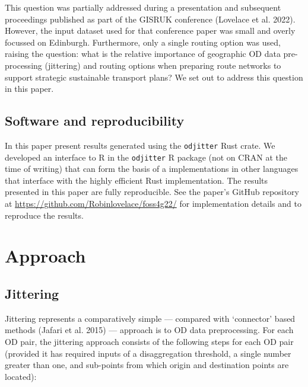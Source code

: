 \documentclass{isprs} %
\begin{document}
This question was partially addressed during a presentation and subsequent proceedings published as part of the GISRUK conference (Lovelace et al. 2022).
However, the input dataset used for that conference paper was small and overly focussed on Edinburgh.
Furthermore, only a single routing option was used, raising the question:
what is the relative importance of geographic OD data pre-processing (jittering) and routing options when preparing route networks to support strategic sustainable transport plans?
We set out to address this question in this paper.

\hypertarget{software-and-reproducibility}{%
\subsection{Software and reproducibility}\label{software-and-reproducibility}}

In this paper present results generated using the \texttt{odjitter} Rust crate.
We developed an interface to R in the \texttt{odjitter} R package (not on CRAN at the time of writing) that can form the basis of a implementations in other languages that interface with the highly efficient Rust implementation.
The results presented in this paper are fully reproducible.
See the paper's GitHub repository at \url{https://github.com/Robinlovelace/foss4g22/} for implementation details and to reproduce the results.

\hypertarget{approach}{%
\section{Approach}\label{approach}}

\hypertarget{jittering}{%
\subsection{Jittering}\label{jittering}}

Jittering represents a comparatively simple --- compared with `connector' based methods (Jafari et al. 2015) --- approach is to OD data preprocessing.
For each OD pair, the jittering approach consists of the following steps for each OD pair (provided it has required inputs of a disaggregation threshold, a single number greater than one, and sub-points from which origin and destination points are located):
\end{document}
